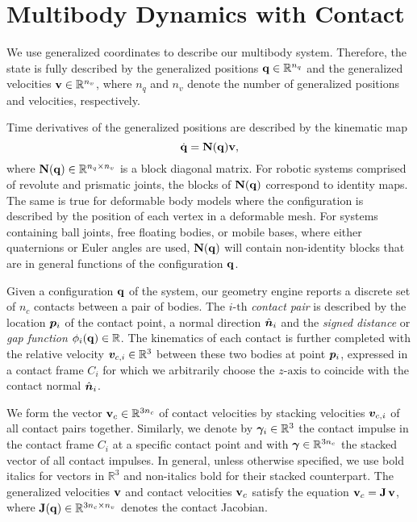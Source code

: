 \section{Multibody Dynamics with Contact}
\label{sec:multibody_dynamics_with_contact}

We use generalized coordinates to describe our multibody system. Therefore, the
state is fully described by the generalized positions
${\mathbf{q}}\in\mathbb{R}^{n_q}$ and the generalized velocities
${\mathbf{v}}\in\mathbb{R}^{n_v}$, where $n_q$ and $n_v$ denote the number of
generalized positions and velocities, respectively.

Time derivatives of the generalized positions are described by the kinematic map
\begin{equation}
	\dot{\mf{q}} = \mf{N}(\mf{q})\mf{v},
	\label{eq:kinematic_map}
\end{equation}
where ${\mathbf{N}}({\mathbf{q}})\in\mathbb{R}^{n_q\times n_v}$ is a block diagonal matrix.
For robotic systems comprised of revolute and prismatic joints, the blocks of
${\mathbf{N}}({\mathbf{q}})$ correspond to identity maps. The same is true for deformable
body models where the configuration is described by the position of each
vertex in a deformable mesh. For systems containing ball joints, free floating
bodies, or mobile bases, where either quaternions or Euler angles are used,
${\mathbf{N}}({\mathbf{q}})$ will contain non-identity blocks that are in general functions
of the configuration ${\mathbf{q}}$.

Given a configuration ${\mathbf{q}}$ of the system, our geometry engine reports a
discrete set of $n_c$ contacts between a pair of bodies. The $i\text{-th}$
\emph{contact pair} is described by the location ${\bm{p}}_i$ of the contact
point, a normal direction $\hat{{\bm{n}}}_i$ and the \emph{signed distance} or
\emph{gap function} $\phi_i({\mathbf{q}})\in\mathbb{R}$. The kinematics of each
contact is further completed with the relative velocity
${\bm{v}}_{c,i}\in\mathbb{R}^3$ between these two bodies at point ${\bm{p}}_i$,
expressed in a contact frame $C_i$ for which we arbitrarily choose the
$z\text{-axis}$ to coincide with the contact normal $\hat{{\bm{n}}}_i$.

We form the vector ${\mathbf{v}}_{c}\in\mathbb{R}^{3n_c}$ of contact velocities by
stacking velocities ${\bm{v}}_{c,i}$ of all contact pairs together. Similarly, we
denote by ${\bm\gamma}_i\in\mathbb{R}^3$ the contact impulse in the contact frame $C_i$ at a specific contact
point and with ${\bm\gamma}\in\mathbb{R}^{3n_c}$ the stacked vector of all contact impulses.
In general, unless otherwise specified, we use bold italics for vectors in
$\mathbb{R}^3$ and non-italics bold for their stacked counterpart. The
generalized velocities ${\mathbf{v}}$ and contact velocities ${\mathbf{v}}_c$ satisfy the
equation ${\mathbf{v}}_c={\mathbf{J}}\,{\mathbf{v}}$, where
${\mathbf{J}}({\mathbf{q}})\in\mathbb{R}^{3n_c\times n_v}$ denotes the contact Jacobian.

